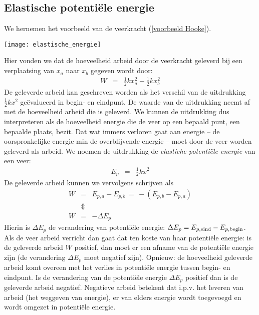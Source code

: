 \documentclass{ximera}
\begin{document}
	
	\subsection{Elastische potentiële energie}\label{elastische
	potentiele energie}
	
	We hernemen het voorbeeld van de veerkracht (\ref{voorbeeld Hooke}).
	\begin{image}
	\texttt{[image: elastische\_energie]}
	\end{image}



	Hier vonden we dat de hoeveelheid arbeid door de veerkracht geleverd
	bij een verplaatsing van $x_a$ naar $x_b$ gegeven wordt door:
	\begin{eqnarray*}
	W&=&\frac{1}{2}kx_ a^2-\frac{1}{2}kx_ b^2
	\end{eqnarray*}
	De geleverde arbeid kan geschreven worden als het verschil van de uitdrukking $\frac{1}{2}kx^2$ geëvalueerd in begin- en eindpunt. De waarde van de uitdrukking neemt af met de hoeveelheid arbeid die is geleverd. We kunnen de uitdrukking dus interpreteren als de hoeveelheid energie die de veer op een bepaald punt, een bepaalde plaats, bezit. Dat wat immers verloren gaat aan energie -- de oorspronkelijke energie min de overblijvende energie -- moet door de veer worden geleverd als arbeid. We noemen de uitdrukking de \textit{elastiche potentiële energie} van een veer:
	\begin{eqnarray}
	E_p&=&\frac{1}{2}kx^2
	\end{eqnarray}
	De geleverde arbeid kunnen we vervolgens schrijven als
	\begin{eqnarray*}
	W&=&E_{p,a}-E_{p,b}\,=\,-(E_{p,b}-E_{p,a})\\
	&\Updownarrow&\\
	W&=&-\Delta E_p
	\end{eqnarray*}
	Hierin is $\Delta E_p$ de verandering van potentiële energie: $\Delta E_p=E_{p,\rm eind}-E_{p,\rm begin}$. Als de veer arbeid verricht dan gaat dat ten koste van haar potentiële energie: is de geleverde arbeid $W$ positief, dan moet er een afname van de potentiële energie zijn (de verandering $\Delta E_p$ moet negatief zijn). Opnieuw: de hoe\-veel\-heid geleverde arbeid komt overeen met het verlies in potentiële energie tussen begin- en eindpunt. Is de verandering van de potentiële energie $\Delta E_p$ positief dan is de geleverde arbeid negatief. Negatieve arbeid betekent dat i.p.v. het leveren van arbeid (het weggeven van energie), er van elders energie wordt toegevoegd en wordt omgezet in potentiële energie.
	
\end{document}

